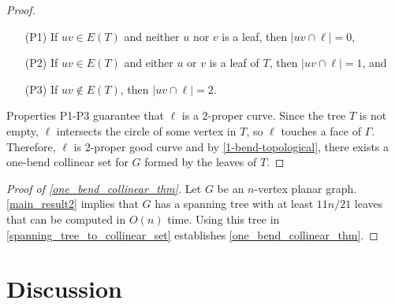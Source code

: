 \documentclass{article}
\newcommand{\pat}[1]{\textcolor{red}{PM: #1}}
\newtheorem{thm}{Theorem}
\theoremstyle{definition}
\begin{document}
\begin{proof}
    \begin{enumerate}
        \item [(P1)] If $uv \in E(T)$ and neither $u$ nor $v$ is a leaf, then $|uv \cap \ell| = 0$,

        \item [(P2)] If $uv \in E(T)$ and either $u$ or $v$ is a leaf of $T$, then $|uv \cap \ell| = 1$, and

        \item [(P3)] If $uv \notin E(T)$, then $|uv \cap \ell| = 2$.
    \end{enumerate}

    Properties P1-P3 guarantee that $\ell$ is a 2-proper curve. Since the tree $T$ is not empty, $\ell$ intersects the circle of some vertex in $T$, so $\ell$ touches a face of $\Gamma$. Therefore, $\ell$ is $2$-proper good curve and by \cref{1-bend-topological}, there exists a one-bend collinear set for $G$ formed by the leaves of $T$.
\end{proof}

\begin{proof}[Proof of \cref{one_bend_collinear_thm}]
Let $G$ be an $n$-vertex planar graph. \cref{main_result2} implies that $G$ has a spanning tree with at least $11n/21$ leaves that can be computed in $O(n)$ time. Using this tree in \cref{spanning_tree_to_collinear_set} establishes \cref{one_bend_collinear_thm}.
\end{proof}

\section{Discussion}
\label{discussion}



\end{document}
